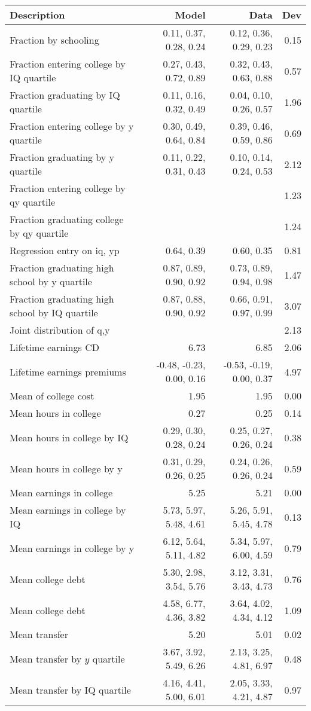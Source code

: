 \begin{tabular}{lrrr}
\hline
Description & Model  & Data  & Dev  \\ 
\hline
Fraction by schooling & 0.11, 0.37, 0.28, 0.24  & 0.12, 0.36, 0.29, 0.23  & 0.15  \\ 
Fraction entering college by IQ quartile & 0.27, 0.43, 0.72, 0.89  & 0.32, 0.43, 0.63, 0.88  & 0.57  \\ 
Fraction graduating by IQ quartile & 0.11, 0.16, 0.32, 0.49  & 0.04, 0.10, 0.26, 0.57  & 1.96  \\ 
Fraction entering college by y quartile & 0.30, 0.49, 0.64, 0.84  & 0.39, 0.46, 0.59, 0.86  & 0.69  \\ 
Fraction graduating by y quartile & 0.11, 0.22, 0.31, 0.43  & 0.10, 0.14, 0.24, 0.53  & 2.12  \\ 
Fraction entering college by qy quartile &   &   & 1.23  \\ 
Fraction graduating college by qy quartile &   &   & 1.24  \\ 
Regression entry on iq, yp & 0.64, 0.39  & 0.60, 0.35  & 0.81  \\ 
Fraction graduating high school by y quartile & 0.87, 0.89, 0.90, 0.92  & 0.73, 0.89, 0.94, 0.98  & 1.47  \\ 
Fraction graduating high school by IQ quartile & 0.87, 0.88, 0.90, 0.92  & 0.66, 0.91, 0.97, 0.99  & 3.07  \\ 
Joint distribution of q,y &   &   & 2.13  \\ 
Lifetime earnings CD & 6.73  & 6.85  & 2.06  \\ 
Lifetime earnings premiums & -0.48, -0.23, 0.00, 0.16  & -0.53, -0.19, 0.00, 0.37  & 4.97  \\ 
Mean of college cost & 1.95  & 1.95  & 0.00  \\ 
Mean hours in college & 0.27  & 0.25  & 0.14  \\ 
Mean hours in college by IQ & 0.29, 0.30, 0.28, 0.24  & 0.25, 0.27, 0.26, 0.24  & 0.38  \\ 
Mean hours in college by y & 0.31, 0.29, 0.26, 0.25  & 0.24, 0.26, 0.26, 0.24  & 0.59  \\ 
Mean earnings in college & 5.25  & 5.21  & 0.00  \\ 
Mean earnings in college by IQ & 5.73, 5.97, 5.48, 4.61  & 5.26, 5.91, 5.45, 4.78  & 0.13  \\ 
Mean earnings in college by y & 6.12, 5.64, 5.11, 4.82  & 5.34, 5.97, 6.00, 4.59  & 0.79  \\ 
Mean college debt & 5.30, 2.98, 3.54, 5.76  & 3.12, 3.31, 3.43, 4.73  & 0.76  \\ 
Mean college debt & 4.58, 6.77, 4.36, 3.82  & 3.64, 4.02, 4.34, 4.12  & 1.09  \\ 
Mean transfer & 5.20  & 5.01  & 0.02  \\ 
Mean transfer by $y$ quartile & 3.67, 3.92, 5.49, 6.26  & 2.13, 3.25, 4.81, 6.97  & 0.48  \\ 
Mean transfer by IQ quartile & 4.16, 4.41, 5.00, 6.01  & 2.05, 3.33, 4.21, 4.87  & 0.97  \\ 
\hline
\end{tabular}%
